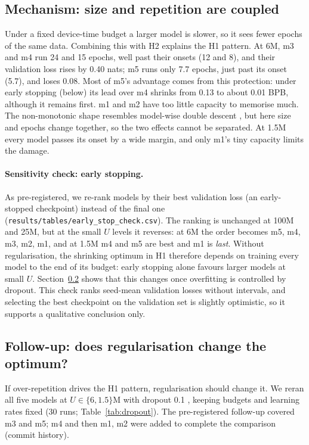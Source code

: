 \documentclass[11pt]{article}
\begin{document}
\subsection{Mechanism: size and repetition are coupled}\label{sec:mechanism}

Under a fixed device-time budget a larger model is slower, so it sees fewer epochs of the same data. Combining
this with H2 explains the H1 pattern. At 6M, m3 and m4 run 24 and 15 epochs, well past their onsets (12 and 8),
and their validation loss rises by 0.40 nats; m5 runs only 7.7 epochs, just past its onset (5.7), and loses 0.08.
Most of m5's advantage comes from this protection: under early stopping (below) its lead over m4 shrinks from
0.13 to about 0.01 BPB, although it remains first. m1 and m2 have too little capacity to memorise much. The
non-monotonic shape resembles model-wise double descent \citep{nakkiran2021deep}, but here size and epochs
change together, so the two effects cannot be separated. At 1.5M every model passes its onset by a wide margin, 
and only m1's tiny capacity
limits the damage.

\paragraph{Sensitivity check: early stopping.}
As pre-registered, we re-rank models by their best validation loss (an early-stopped checkpoint) instead of the
final one (\texttt{results/tables/early\_stop\_check.csv}). The ranking is unchanged at 100M and 25M, but at the
small $U$ levels it reverses: at 6M the order becomes m5, m4, m3, m2, m1, and at 1.5M m4 and m5 are best and m1
is \emph{last}. Without regularisation, the shrinking optimum in H1 therefore depends on training every model to
the end of its budget: early stopping alone favours larger models at small $U$. Section~\ref{sec:dropout} shows
that this changes once overfitting is controlled by dropout. This check ranks seed-mean validation losses without
intervals, and selecting the best checkpoint on the validation set is slightly optimistic, so it supports a
qualitative conclusion only.

\subsection{Follow-up: does regularisation change the optimum?}\label{sec:dropout}

If over-repetition drives the H1 pattern, regularisation should change it. We reran all five models at
$U\in\{6,1.5\}$M with dropout 0.1 \citep{srivastava2014dropout}, keeping budgets and learning rates fixed
(30 runs; Table~\ref{tab:dropout}). The pre-registered follow-up covered m3 and m5; m4 and then m1, m2 were
added to complete the comparison (commit history).
\end{document}
